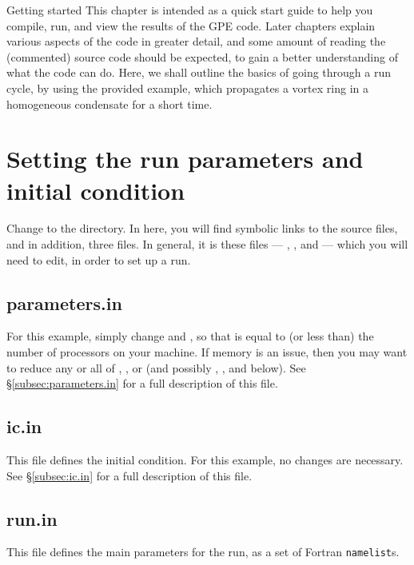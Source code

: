 
\begin{chapter}{\label{cha:quickstart}Getting started}
  This chapter is intended as a quick start guide to help you compile, run, and
  view the results of the GPE code.  Later chapters explain various aspects of
  the code in greater detail, and some amount of reading the (commented) source
  code should be expected, to gain a better understanding of what the code can
  do.  Here, we shall outline the basics of going through a run cycle, by using
  the provided  example, which propagates a vortex ring in a
  homogeneous condensate for a short time.

  \section{Setting the run parameters and initial condition}
  Change to the  directory.  In here, you
  will find symbolic links to the source files, and in addition, three
   files.  In general, it is these files ---
  , , and  --- which you
  will need to edit, in order to set up a run.

  \subsection{parameters.in}
  For this example, simply change  and , so
  that  is equal to (or less than) the number of
  processors on your machine.  If memory is an issue, then you may want to
  reduce any or all of , , or  (and possibly
  , , and  below).  See
  \S\ref{subsec:parameters.in} for a full description of this file.  

  \subsection{ic.in}
  This file defines the initial condition.  For this example, no changes are
  necessary.  See \S\ref{subsec:ic.in} for a full description of this file.

  \subsection{\label{subsec:runin}run.in}
  This file defines the main parameters for the run, as a set of Fortran
  \verb"namelist"s.
  

\end{chapter}
